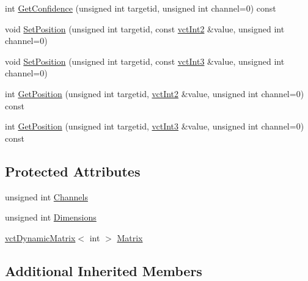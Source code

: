 \begin{DoxyCompactItemize}
\item 
int \hyperlink{classsvl_sample_targets_ab2853c47b0768157de97609c59c23d32}{Get\-Confidence} (unsigned int targetid, unsigned int channel=0) const 
\item 
void \hyperlink{classsvl_sample_targets_ab78af6a91d27d04bef57a5c259a12c45}{Set\-Position} (unsigned int targetid, const \hyperlink{vct_fixed_size_vector_types_8h_add8c88eb6a432b15f14b866b9c35325f}{vct\-Int2} \&value, unsigned int channel=0)
\item 
void \hyperlink{classsvl_sample_targets_a1b59350c466ac5d3b23c193859851631}{Set\-Position} (unsigned int targetid, const \hyperlink{vct_fixed_size_vector_types_8h_a40c5371f8f2d132b1fa17450428d213f}{vct\-Int3} \&value, unsigned int channel=0)
\item 
int \hyperlink{classsvl_sample_targets_a1199ccd908cc4eafa8d8d6ebae94987c}{Get\-Position} (unsigned int targetid, \hyperlink{vct_fixed_size_vector_types_8h_add8c88eb6a432b15f14b866b9c35325f}{vct\-Int2} \&value, unsigned int channel=0) const 
\item 
int \hyperlink{classsvl_sample_targets_aba5abd4a1d01a920ba2014be7d681dff}{Get\-Position} (unsigned int targetid, \hyperlink{vct_fixed_size_vector_types_8h_a40c5371f8f2d132b1fa17450428d213f}{vct\-Int3} \&value, unsigned int channel=0) const 
\end{DoxyCompactItemize}
\subsection*{Protected Attributes}
\begin{DoxyCompactItemize}
\item 
unsigned int \hyperlink{classsvl_sample_targets_a2abdd733857b806aac8d3340dfb51c47}{Channels}
\item 
unsigned int \hyperlink{classsvl_sample_targets_aefc5e0137cd9dfee5611532f336610bf}{Dimensions}
\item 
\hyperlink{classvct_dynamic_matrix}{vct\-Dynamic\-Matrix}$<$ int $>$ \hyperlink{classsvl_sample_targets_ae0bfb3f3979168e88f318894f4439764}{Matrix}
\end{DoxyCompactItemize}
\subsection*{Additional Inherited Members}


